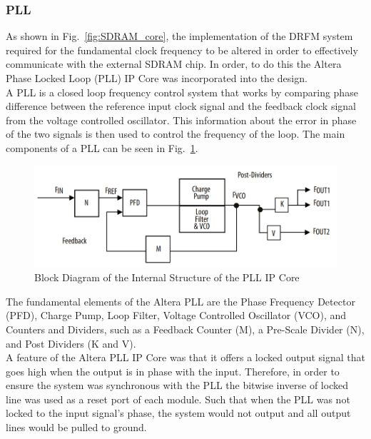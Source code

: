 			\subsubsection{PLL}
		As shown in Fig.~\ref{fig:SDRAM_core}, the implementation of the DRFM system required for the fundamental clock frequency to be altered in order to effectively communicate with the external SDRAM chip. In order, to do this the Altera Phase Locked Loop (PLL) IP Core was incorporated into the design\cite{PLL}. \\ \newline A PLL is a closed loop frequency control system that works by comparing phase difference between the reference input clock signal and the feedback clock signal from the voltage controlled oscillator. This information about the error in phase of the two signals is then used to control the frequency of the loop. The main components of a PLL can be seen in Fig.~\ref{fig:PLL}. 
		
		\begin{figure}[h!]
			\centering
			\includegraphics[width=0.95\linewidth]{img/pll}
			\caption{Block Diagram of the Internal Structure of the PLL IP Core \cite{PLL}}
			\label{fig:PLL}
		\end{figure}
		\noindent The fundamental elements of the Altera PLL are the Phase Frequency Detector (PFD), Charge Pump, Loop Filter, Voltage Controlled Oscillator (VCO), and Counters and Dividers, such as a Feedback Counter (M), a Pre-Scale Divider (N), and Post Dividers (K and V). \\ \newline A feature of the Altera PLL IP Core was that it offers a locked output signal that goes high when the output is in phase with the input. Therefore, in order to ensure the system was synchronous with the PLL the bitwise inverse of locked line was used as a reset port of each module. Such that when the PLL was not locked to the input signal's phase, the system would not output and all output lines would be pulled to ground. \\ 
		
